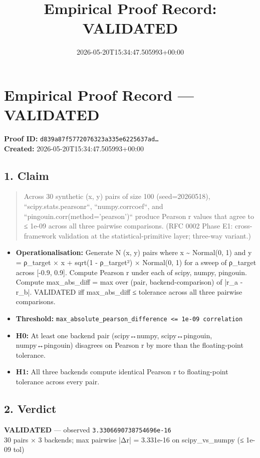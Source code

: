 \documentclass{article}
\title{Empirical Proof Record: VALIDATED}
\date{2026-05-20T15:34:47.505993+00:00}
\begin{document}
\maketitle
\section*{Empirical Proof Record --- \textcolor{validated}{\textbf{VALIDATED}}}
\textbf{Proof ID:} \texttt{d839a87f5772076323a335e6225637ad\dots}\\
\textbf{Created:} 2026-05-20T15:34:47.505993+00:00
\subsection*{1. Claim}
\begin{quote}Across 30 synthetic (x, y) pairs of size 100 (seed=20260518), ``scipy.stats.pearsonr``, ``numpy.corrcoef``, and ``pingouin.corr(method='pearson')`` produce Pearson r values that agree to ≤ 1e-09 across all three pairwise comparisons. (RFC 0002 Phase E1: cross-framework validation at the statistical-primitive layer; three-way variant.)\end{quote}
\begin{itemize}
\item \textbf{Operationalisation:} Generate N (x, y) pairs where x \textasciitilde{} Normal(0, 1) and y = ρ\_target × x + sqrt(1 - ρ\_target²) × Normal(0, 1) for a sweep of ρ\_target across [-0.9, 0.9]. Compute Pearson r under each of scipy, numpy, pingouin. Compute max\_abs\_diff = max over (pair, backend-comparison) of |r\_a - r\_b|. VALIDATED iff max\_abs\_diff ≤ tolerance across all three pairwise comparisons.
\item \textbf{Threshold:} \texttt{max\_absolute\_pearson\_difference <= 1e-09 correlation}
\item \textbf{H0:} At least one backend pair (scipy↔numpy, scipy↔pingouin, numpy↔pingouin) disagrees on Pearson r by more than the floating-point tolerance.
\item \textbf{H1:} All three backends compute identical Pearson r to floating-point tolerance across every pair.
\end{itemize}
\subsection*{2. Verdict}
\textcolor{validated}{\textbf{VALIDATED}} --- observed \texttt{3.3306690738754696e-16}\\
30 pairs × 3 backends; max pairwise |Δr| = 3.331e-16 on scipy\_vs\_numpy (≤ 1e-09 tol)
\end{document}
